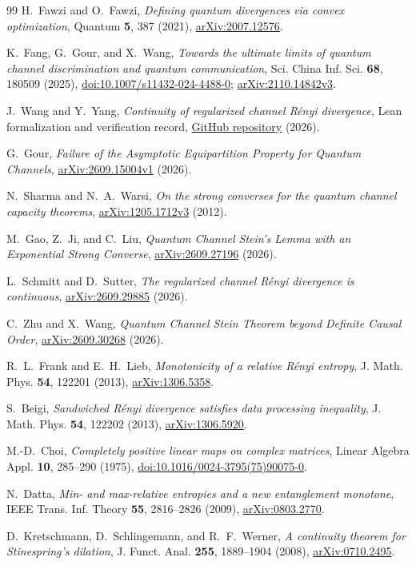 \documentclass[11pt,letterpaper]{article}
\numberwithin{equation}{section}
\begin{document}
\begin{thebibliography}{99}
H.~Fawzi and O.~Fawzi, \emph{Defining quantum divergences via convex optimization},
Quantum \textbf{5}, 387 (2021),
\href{https://arxiv.org/abs/2007.12576}{arXiv:2007.12576}.

K.~Fang, G.~Gour, and X.~Wang,
\emph{Towards the ultimate limits of quantum channel discrimination and quantum communication},
Sci. China Inf. Sci. \textbf{68}, 180509 (2025),
\href{https://doi.org/10.1007/s11432-024-4488-0}{doi:10.1007/s11432-024-4488-0};
\href{https://arxiv.org/abs/2110.14842v3}{arXiv:2110.14842v3}.

J.~Wang and Y.~Yang, \emph{Continuity of regularized channel R\'enyi divergence},
Lean formalization and verification record,
\href{https://github.com/JWang226/continuity-of-regularized-channel-renyi-divergence}{GitHub repository} (2026).

G.~Gour, \emph{Failure of the Asymptotic Equipartition Property for Quantum Channels},
\href{https://arxiv.org/abs/2609.15004v1}{arXiv:2609.15004v1} (2026).

N.~Sharma and N.~A.~Warsi,
\emph{On the strong converses for the quantum channel capacity theorems},
\href{https://arxiv.org/abs/1205.1712v3}{arXiv:1205.1712v3} (2012).

M.~Gao, Z.~Ji, and C.~Liu,
\emph{Quantum Channel Stein's Lemma with an Exponential Strong Converse},
\href{https://arxiv.org/abs/2609.27196}{arXiv:2609.27196} (2026).

L.~Schmitt and D.~Sutter,
\emph{The regularized channel R\'enyi divergence is continuous},
\href{https://arxiv.org/abs/2609.29885}{arXiv:2609.29885} (2026).

C.~Zhu and X.~Wang,
\emph{Quantum Channel Stein Theorem beyond Definite Causal Order},
\href{https://arxiv.org/abs/2609.30268}{arXiv:2609.30268} (2026).

R.~L.~Frank and E.~H.~Lieb, \emph{Monotonicity of a relative R\'enyi entropy},
J. Math. Phys. \textbf{54}, 122201 (2013),
\href{https://arxiv.org/abs/1306.5358}{arXiv:1306.5358}.

S.~Beigi, \emph{Sandwiched R\'enyi divergence satisfies data processing inequality},
J. Math. Phys. \textbf{54}, 122202 (2013),
\href{https://arxiv.org/abs/1306.5920}{arXiv:1306.5920}.

M.-D.~Choi, \emph{Completely positive linear maps on complex matrices},
Linear Algebra Appl. \textbf{10}, 285--290 (1975),
\href{https://doi.org/10.1016/0024-3795(75)90075-0}{doi:10.1016/0024-3795(75)90075-0}.

N.~Datta, \emph{Min- and max-relative entropies and a new entanglement monotone},
IEEE Trans. Inf. Theory \textbf{55}, 2816--2826 (2009),
\href{https://arxiv.org/abs/0803.2770}{arXiv:0803.2770}.

D.~Kretschmann, D.~Schlingemann, and R.~F.~Werner,
\emph{A continuity theorem for Stinespring's dilation},
J. Funct. Anal. \textbf{255}, 1889--1904 (2008),
\href{https://arxiv.org/abs/0710.2495}{arXiv:0710.2495}.

\end{thebibliography}
\endgroup
\end{document}
